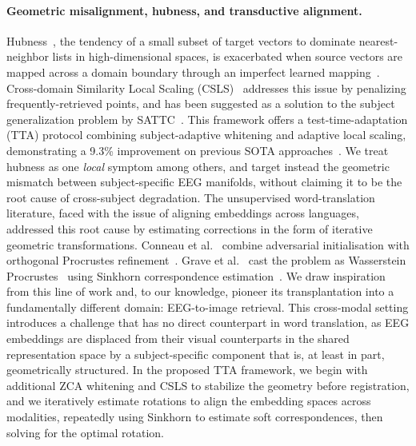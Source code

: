 \documentclass{article}
\begin{document}
\paragraph{Geometric misalignment, hubness, and transductive alignment.}
Hubness~\cite{radovanovic2010hubs}, the tendency of a small subset of target vectors to dominate
nearest-neighbor lists in high-dimensional spaces, is exacerbated when source vectors are mapped
across a domain boundary through an imperfect learned mapping~\cite{dinu2015hubness}.
Cross-domain Similarity Local Scaling (CSLS)~\cite{conneau2018muse} addresses this issue by penalizing frequently-retrieved points, and has been suggested as a solution to the subject generalization problem by SATTC~\cite{huang2026sattc}. This framework offers a test-time-adaptation (TTA) protocol combining subject-adaptive whitening and adaptive local scaling, demonstrating a  9.3\% improvement on previous SOTA approaches~\cite{li2024atm}. We treat hubness as one \emph{local} symptom among others, and target instead the geometric mismatch between subject-specific EEG manifolds, without claiming it to be the root cause of cross-subject degradation.
The unsupervised word-translation literature, faced with the issue of aligning embeddings across languages, addressed this root cause by estimating corrections in the form of iterative geometric transformations.
Conneau et al.~\cite{conneau2018muse} combine adversarial initialisation with orthogonal Procrustes refinement~\cite{schonemann1966procrustes}. Grave et al.~\cite{grave2019wasserstein} cast the problem as Wasserstein
Procrustes~\cite{peyre2019computational} using Sinkhorn correspondence estimation~\cite{cuturi2013sinkhorn}.
We draw inspiration from this line of work and, to our knowledge, pioneer its transplantation into a fundamentally different domain: EEG-to-image retrieval. This cross-modal setting introduces a challenge that has no direct counterpart in word translation, as EEG embeddings are displaced from their visual counterparts in the shared representation space by a subject-specific component that is, at least in part, geometrically structured.
In the proposed TTA framework, we begin with additional ZCA whitening and CSLS to stabilize the geometry before registration, and we iteratively estimate rotations to align the embedding spaces across modalities, repeatedly using Sinkhorn to estimate soft correspondences, then solving for the optimal rotation.

\end{document}
